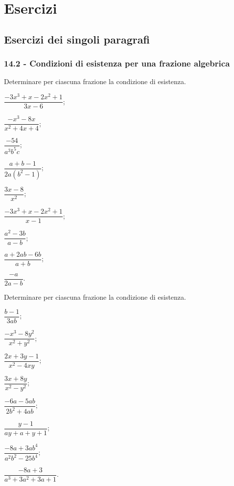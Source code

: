 
\section{Esercizi}
\subsection{Esercizi dei singoli paragrafi}
\subsubsection*{14.2 - Condizioni di esistenza per una frazione algebrica}

\begin{esercizio}
\label{ese:14.1}
Determinare per ciascuna frazione la condizione di esistenza.
\begin{multicols}{3}
\begin{enumeratea}
 \item $\dfrac{-3x^{3}+x-2x^{2}+1}{3x-6}$;
 \item $\dfrac{-x^{3}-8x}{x^{2}+4x+4}$;
 \item $\dfrac{-54}{a^{3}b^{5}c}$;
 \item $\dfrac{a+b-1}{2a \left(b^{2}-1\right)}$;
 \item $\dfrac{3x-8}{x^{2}}$;
 \item $\dfrac{-3x^{3}+x-2x^{2}+1}{x-1}$;
 \item $\dfrac{a^{{2}}-3b}{a-b}$;
 \item $\dfrac{a+2ab-6b}{a+b}$;
 \item $\dfrac{-a}{2a-b}$.
\end{enumeratea}
\end{multicols}
\end{esercizio}

\begin{esercizio}
\label{ese:14.2}
Determinare per ciascuna frazione la condizione di esistenza.
\begin{multicols}{3}
\begin{enumeratea}
 \item $\dfrac{b-1}{3ab}$;
 \item $\dfrac{-x^{{3}}-8y^{{2}}}{x^{{2}}+y^{{2}}}$;
 \item $\dfrac{2x+3y-1}{x^{2}-4xy}$;
 \item $\dfrac{3x+8y}{x^{2}-y^{2}}$;
 \item $\dfrac{-6a-5ab}{2b^{2}+4ab}$;
 \item $\dfrac{y-1}{ay+a+y+1}$;
 \item $\dfrac{-8a+3ab^{4}}{a^{2}b^{2}-25b^{4}}$;
 \item $\dfrac{-8a+3}{a^{3}+3a^{2}+3a+1}$.
\end{enumeratea}
\end{multicols}
\end{esercizio}

